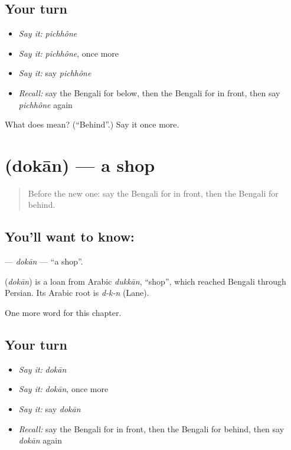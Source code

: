 \subsection*{Your turn}
\begin{itemize}
\raggedright
  \item \emph{Say it:} \emph{pichhône}
  \item \emph{Say it:} \emph{pichhône}, once more
  \item \emph{Say it:} say \emph{pichhône}
  \item \emph{Recall:} say the Bengali for below, then the Bengali for in front, then say \emph{pichhône} again
\end{itemize}

\begin{tcolorbox}[breakable,colback=teal!4,colframe=teal!35!black,title={Before you move on}]
What does  mean? (\textquotedblleft{}Behind\textquotedblright{}.) Say it once more.
\end{tcolorbox}
\section[\texorpdfstring{\bn{দোকান} (dokān)}{দোকান (dokān)}]{ (dokān) — a shop}

\label{lesson:BN-C82-dokan}



\begin{quote}
Before the new one: say the Bengali for in front, then the Bengali for behind.
\end{quote}

\subsection*{You'll want to know: }
\textbf{} — \emph{dokān} — \textquotedblleft{}a shop\textquotedblright{}.

\begin{cousinweb}
\textbf{} (\emph{dokān}) is a loan from Arabic \emph{dukkān}, \textquotedblleft{}shop\textquotedblright{}, which reached Bengali through Persian. Its Arabic root is \emph{d-k-n} (Lane).
\end{cousinweb}

\begin{grammarlens}[title={What you've built}]
One more word for this chapter.
\end{grammarlens}

\subsection*{Your turn}
\begin{itemize}
\raggedright
  \item \emph{Say it:} \emph{dokān}
  \item \emph{Say it:} \emph{dokān}, once more
  \item \emph{Say it:} say \emph{dokān}
  \item \emph{Recall:} say the Bengali for in front, then the Bengali for behind, then say \emph{dokān} again
\end{itemize}

